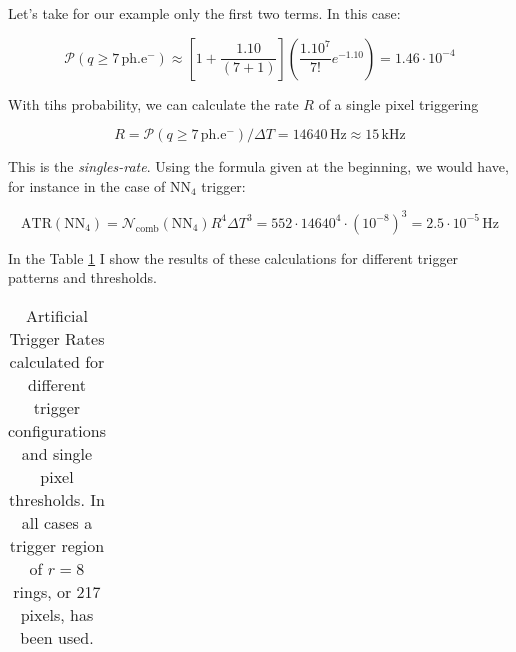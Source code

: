 \documentclass{article}
\def\phe{\u{ph.e^{-}}\xspace}
\def\ATR{\ensuremath{\mathrm{ATR}}\xspace}
\def\Ncomb{\ensuremath{\mathcal{N}_{\mathrm{comb}}}\xspace}
\def\Rate{\ensuremath{R}\xspace}
\def\Time{\ensuremath{\Delta T}\xspace}
\renewcommand{\u}[1]{\ensuremath{\,\mathrm{#1}}}  %
\begin{document}
Let's take for our example only the first two terms. In this case:

\begin{equation*}
\mathcal{P}(q \geq 7\phe) \approx 
\left[ 1 + \frac{1.10}{(7+1)} \right] 
\left( \frac{1.10^{7}}{7!}e^{-1.10} \right) = 1.46\cdot 10^{-4}
\end{equation*}

With tihs probability, we can calculate the rate \Rate of a single
pixel triggering

\begin{equation*}
\Rate = \mathcal{P}(q \geq 7\phe) / \Time = 14640 \u{Hz} 
\approx 15 \u{kHz}
\end{equation*}

This is the \emph{singles-rate}. Using the formula given at the
beginning, we would have, for instance in the case of NN$_4$ trigger:

\begin{equation*}
\ATR(\mathrm{NN}_4) = 
\Ncomb(\mathrm{NN}_4) \Rate^4 \Time^3 =
552 \cdot 14640^4 \cdot (10^{-8})^3 = 2.5\cdot 10^{-5} \u{Hz}
\end{equation*}

In the Table \ref{table:results1} I show the results of these
calculations for different trigger patterns and thresholds.

\begin{table}[t]
\begin{center}
  \begin{tabular}{cr}
  \end{tabular}
  \caption[Artificial Trigger Rates]{Artificial Trigger Rates
    calculated for different trigger configurations and single pixel
    thresholds. In all cases a trigger region of $r=8$ rings, or 217
    pixels, has been used.}
  \label{table:results1}
\end{center}
\end{table}
\end{document}
